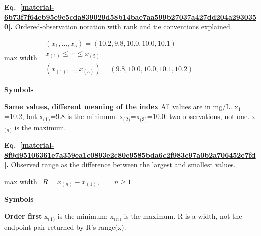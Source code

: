 \documentclass[11pt,a4paper]{article}
\begin{document}
\par\medskip
\begin{samepage}
\label{material-6b73f7f64eb95e9e5cda839029d58b14bae7aa599b27037a427dd204a2930350}
\noindent\textbf{Eq.~\ref*{material-6b73f7f64eb95e9e5cda839029d58b14bae7aa599b27037a427dd204a2930350}.} Ordered-observation notation with rank and tie conventions explained.\par\nopagebreak
\begin{center}\begin{adjustbox}{max width=\linewidth}$\displaystyle \begin{gathered}(x_1,\ldots,x_5)=(10.2,9.8,10.0,10.0,10.1)\\x_{(1)}\le\cdots\le x_{(5)}\\(x_{(1)},\ldots,x_{(5)})=(9.8,10.0,10.0,10.1,10.2)\end{gathered}$\end{adjustbox}\end{center}

\par\noindent\textbf{Symbols}

\par\noindent\textbf{Same values, different meaning of the index} All values are in mg/L. x\ensuremath{{}_1}=10.2, but x\ensuremath{{}_{(}}\ensuremath{{}_1}\ensuremath{{}_{)}}=9.8 is the minimum. x\ensuremath{{}_{(}}\ensuremath{{}_2}\ensuremath{{}_{)}}=x\ensuremath{{}_{(}}\ensuremath{{}_3}\ensuremath{{}_{)}}=10.0: two observations, not one. x\ensuremath{{}_{(}}\ensuremath{{}_n}\ensuremath{{}_{)}} is the maximum.

\end{samepage}
\medskip

\par\medskip
\begin{samepage}
\label{material-8f9d95106361e7a359ea1c0893e2c80e9585bda6c2f983c97a0b2a706452e7fd}
\noindent\textbf{Eq.~\ref*{material-8f9d95106361e7a359ea1c0893e2c80e9585bda6c2f983c97a0b2a706452e7fd}.} Observed range as the difference between the largest and smallest values.\par\nopagebreak
\begin{center}\begin{adjustbox}{max width=\linewidth}$\displaystyle R=x_{(n)}-x_{(1)},\qquad n\ge1$\end{adjustbox}\end{center}

\par\noindent\textbf{Symbols}

\par\noindent\textbf{Order first} x\ensuremath{{}_{(}}\ensuremath{{}_1}\ensuremath{{}_{)}} is the minimum; x\ensuremath{{}_{(}}\ensuremath{{}_n}\ensuremath{{}_{)}} is the maximum. R is a width, not the endpoint pair returned by R's range(x).

\end{samepage}
\medskip
\end{document}
